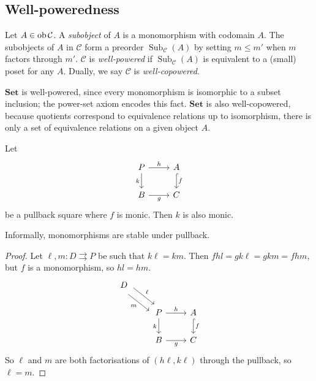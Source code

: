 \subsection{Well-poweredness}
\begin{definition}
    Let \( A \in \operatorname{ob} \mathcal C \).
    A \emph{subobject} of \( A \) is a monomorphism with codomain \( A \).
    The subobjects of \( A \) in \( \mathcal C \) form a preorder \( \operatorname{Sub}_{\mathcal C}(A) \) by setting \( m \leq m' \) when \( m \) factors through \( m' \).
    \( \mathcal C \) is \emph{well-powered} if \( \operatorname{Sub}_{\mathcal C}(A) \) is equivalent to a (small) poset for any \( A \).
    Dually, we say \( \mathcal C \) is \emph{well-copowered}.
\end{definition}
\begin{example}
    \( \mathbf{Set} \) is well-powered, since every monomorphism is isomorphic to a subset inclusion; the power-set axiom encodes this fact.
    \( \mathbf{Set} \) is also well-copowered, because quotients correspond to equivalence relations up to isomorphism, there is only a set of equivalence relations on a given object \( A \).
\end{example}
\begin{lemma}
    Let
\[\begin{tikzcd}
	P & A \\
	B & C
	\arrow["h", from=1-1, to=1-2]
	\arrow["f", hook, from=1-2, to=2-2]
	\arrow["k"', from=1-1, to=2-1]
	\arrow["g"', from=2-1, to=2-2]
\end{tikzcd}\]
    be a pullback square where \( f \) is monic.
    Then \( k \) is also monic.
\end{lemma}
Informally, monomorphisms are stable under pullback.
\begin{proof}
    Let \( \ell, m : D \rightrightarrows P \) be such that \( k\ell = km \).
    Then \( fhl = gk\ell = gkm = fhm \), but \( f \) is a monomorphism, so \( hl = hm \).
\[\begin{tikzcd}
	D \\
	& P & A \\
	& B & C
	\arrow["h", from=2-2, to=2-3]
	\arrow["f", hook, from=2-3, to=3-3]
	\arrow["k"', from=2-2, to=3-2]
	\arrow["g"', from=3-2, to=3-3]
	\arrow["\ell", shift left=2, from=1-1, to=2-2]
	\arrow["m"', shift right=2, from=1-1, to=2-2]
\end{tikzcd}\]
    So \( \ell \) and \( m \) are both factorisations of \( (h\ell, k\ell) \) through the pullback, so \( \ell = m \).
\end{proof}

